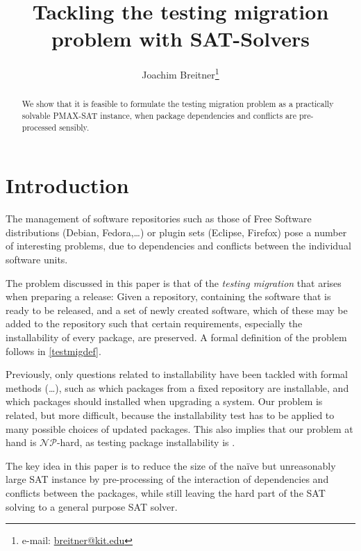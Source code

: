 \documentclass[halfparskip,11pt]{scrartcl}
\author{Joachim Breitner\footnote{e-mail: \href{mailto:breitner@kit.edu}{breitner@kit.edu}}}
\title{Tackling the testing migration problem with SAT-Solvers}
\begin{document}
\maketitle



\begin{abstract}
We show that it is feasible to formulate the testing migration problem as a practically solvable PMAX-SAT instance, when package dependencies and conflicts are pre-processed sensibly.
\end{abstract}


\section{Introduction}

The management of software repositories such as those of Free Software distributions (Debian, Fedora,\dots) or plugin sets (Eclipse, Firefox) pose a number of interesting problems, due to dependencies and conflicts between the individual software units.

The problem discussed in this paper is that of the \emph{testing migration} that arises when preparing a release: Given a repository, containing the software that is ready to be released, and a set of newly created software, which of these may be added to the repository such that certain requirements, especially the installability of every package, are preserved. A formal definition of the problem follows in \ref{testmigdef}.

Previously, only questions related to installability have been tackled with formal methods (\cite{edos}\dots), such as which packages from a fixed repository are installable, and which packages should installed when upgrading a system. Our problem is related, but more difficult, because the installability test has to be applied to many possible choices of updated packages. This also implies that our problem at hand is $\mathcal{NP}$-hard, as testing package installability is \cite{burrows}.

The key idea in this paper is to reduce the size of the naïve but unreasonably large SAT instance by pre-processing of the interaction of dependencies and conflicts between the packages, while still leaving the hard part of the SAT solving to a general purpose SAT solver.
\end{document}
